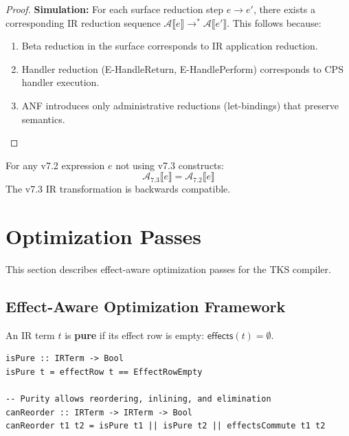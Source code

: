 \begin{proof}
\textbf{Simulation:}
For each surface reduction step $e \to e'$, there exists a corresponding IR reduction sequence $\mathcal{A}\llbracket e \rrbracket \to^* \mathcal{A}\llbracket e' \rrbracket$. This follows because:
\begin{enumerate}
  \item Beta reduction in the surface corresponds to IR application reduction.
  \item Handler reduction (E-HandleReturn, E-HandlePerform) corresponds to CPS handler execution.
  \item ANF introduces only administrative reductions (let-bindings) that preserve semantics.
\end{enumerate}
\end{proof}

\begin{corollary}
\label{cor:v72-compilation}
For any v7.2 expression $e$ not using v7.3 constructs:
\[
\mathcal{A}_{7.3}\llbracket e \rrbracket = \mathcal{A}_{7.2}\llbracket e \rrbracket
\]
The v7.3 IR transformation is backwards compatible.
\end{corollary}

\section{Optimization Passes}
\label{sec:optimization-passes}

This section describes effect-aware optimization passes for the TKS compiler.

\subsection{Effect-Aware Optimization Framework}
\label{subsec:effect-opt-framework}

\begin{definition}
\label{def:purity-analysis}
An IR term $t$ is \textbf{pure} if its effect row is empty: $\mathsf{effects}(t) = \emptyset$.
\begin{verbatim}
isPure :: IRTerm -> Bool
isPure t = effectRow t == EffectRowEmpty

-- Purity allows reordering, inlining, and elimination
canReorder :: IRTerm -> IRTerm -> Bool
canReorder t1 t2 = isPure t1 || isPure t2 || effectsCommute t1 t2
\end{verbatim}
\end{definition}

